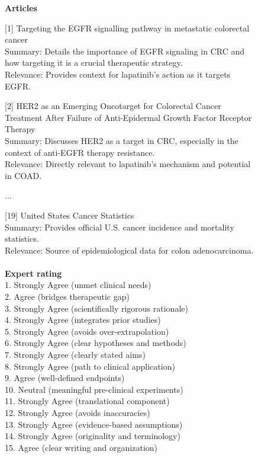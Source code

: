 \begin{figure}[htbp!]
\begin{tcolorbox}[title=Lapatinib for colon cancer (continued)]
\textbf{Articles}

[1] Targeting the EGFR signalling pathway in metastatic colorectal cancer\\
Summary: Details the importance of EGFR signaling in CRC and how targeting it is a crucial therapeutic strategy.\\
Relevance: Provides context for lapatinib's action as it targets EGFR.

[2] HER2 as an Emerging Oncotarget for Colorectal Cancer Treatment After Failure of Anti-Epidermal Growth Factor Receptor Therapy\\
Summary: Discusses HER2 as a target in CRC, especially in the context of anti-EGFR therapy resistance.\\
Relevance: Directly relevant to lapatinib's mechanism and potential in COAD.

...

[19] United States Cancer Statistics\\
Summary: Provides official U.S. cancer incidence and mortality statistics.\\
Relevance: Source of epidemiological data for colon adenocarcinoma.\\
\\
\textbf{Expert rating}\\
1.	Strongly Agree (unmet clinical needs)\\
2.	Agree (bridges therapeutic gap)\\
3.	Strongly Agree (scientifically rigorous rationale)\\
4.	Strongly Agree (integrates prior studies)\\
5.	Strongly Agree (avoids over-extrapolation)\\
6.	Strongly Agree (clear hypotheses and methods)\\
7.	Strongly Agree (clearly stated aims)\\
8.	Strongly Agree (path to clinical application)\\
9.	Agree (well-defined endpoints)\\
10.	Neutral (meaningful pre-clinical experiments)\\
11.	Strongly Agree (translational component)\\
12.	Strongly Agree (avoids inaccuracies)\\
13.	Strongly Agree (evidence-based assumptions)\\
14.	Strongly Agree (originality and terminology)\\
15.	Agree (clear writing and organization)\\
\end{tcolorbox}
\end{figure}



